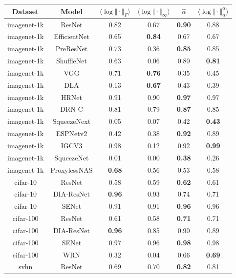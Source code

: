 \begin{table}[t]
\scriptsize
\begin{center}
\begin{tabular}{|c|c|c|c|c|c|}
\hline
Dataset & Model  & $\langle\log\Vert\cdot\Vert_{F}\rangle$ & $\langle\log\Vert\cdot\Vert_{\infty}\rangle$ & $\hat{\alpha}$ & $\langle\log\Vert\cdot\Vert^{\alpha}_{\alpha}\rangle$ \\
\hline
imagenet-1k & ResNet  & 0.82 &  0.67 & \textbf{0.90} & 0.88 \\
 imagenet-1k & EfficientNet  & 0.65 &  \textbf{0.84} & 0.67 & 0.67 \\
 imagenet-1k & PreResNet  & 0.73 &  0.36 & \textbf{0.85} & 0.85 \\
 imagenet-1k & ShuffleNet  & 0.63 &  0.06 & 0.80 & \textbf{0.81} \\
 imagenet-1k & VGG  & 0.71 &  \textbf{0.76} & 0.35 & 0.45 \\
 imagenet-1k & DLA  & 0.13 &  \textbf{0.67} & 0.43 & 0.39 \\
 imagenet-1k & HRNet  & 0.91 &  0.90 & \textbf{0.97} & 0.97 \\
 imagenet-1k & DRN-C  & 0.81 &  0.79 & \textbf{0.87} & 0.85 \\
 imagenet-1k & SqueezeNext  & 0.05 &  0.07 & 0.42 & \textbf{0.43} \\
 imagenet-1k & ESPNetv2  & 0.42 &  0.38 & \textbf{0.92} & 0.89 \\
 imagenet-1k & IGCV3  & 0.98 &  0.12 & 0.92 & \textbf{0.99} \\
 imagenet-1k & SqueezeNet  & 0.01 &  0.00 & \textbf{0.38} & 0.26 \\
 imagenet-1k & ProxylessNAS  & \textbf{0.68} &  0.56 & 0.53 & 0.58 \\
\hline
 cifar-10 & ResNet  & 0.58 &  0.59 & \textbf{0.62} & 0.61 \\
 cifar-10 & DIA-ResNet  & \textbf{0.96} &  0.93 & 0.74 & 0.71 \\
 cifar-10 & SENet  & 0.91 &  0.91 & \textbf{0.96} & 0.96 \\
\hline
 cifar-100 & ResNet  & 0.61 &  0.58 & \textbf{0.71} & 0.71 \\
 cifar-100 & DIA-ResNet  & \textbf{0.96} &  0.85 & 0.90 & 0.89 \\
 cifar-100 & SENet  & 0.97 &  0.96 & \textbf{0.98} & 0.98 \\
 cifar-100 & WRN  & 0.32 &  0.04 & 0.66 & \textbf{0.69} \\
\hline
 svhn & ResNet  & 0.69 &  0.70 & \textbf{0.82} & 0.81 \\

\end{tabular}
\end{center}
\end{table}
